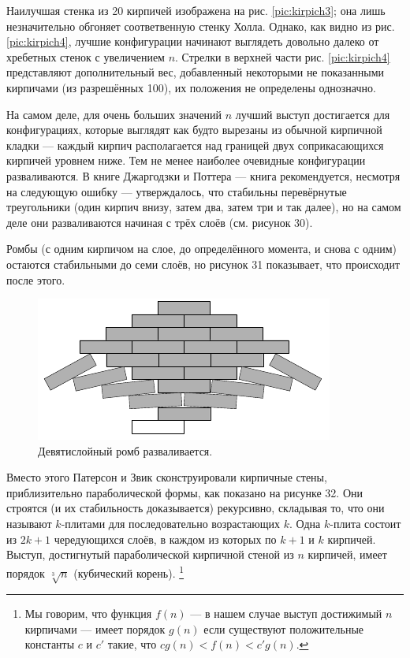 Наилучшая стенка из 20 кирпичей изображена на рис. \ref{pic:kirpich3};
она лишь незначительно обгоняет соответвенную стенку Холла.
Однако, как видно из рис. \ref{pic:kirpich4}, лучшие конфигурации начинают выглядеть довольно далеко от хребетных стенок с увеличением $n$.
Стрелки в верхней части рис. \ref{pic:kirpich4} представляют дополнительный вес, добавленный некоторыми не показанными кирпичами (из разрешённых 100), их положения не определены однозначно.

На самом деле, для очень больших значений $n$ лучший выступ достигается для конфигурациях, которые выглядят как будто вырезаны из обычной кирпичной кладки --- каждый кирпич располагается над границей двух соприкасающихся кирпичей уровнем ниже.
Тем не менее наиболее очевидные конфигурации разваливаются.
В книге Джаргодзки и Поттера \cite{38} --- книга рекомендуется, несмотря на следующую ошибку --- утверждалось, что стабильны перевёрнутые треугольники (один кирпич внизу, затем два, затем три и так далее), но на самом деле они разваливаются начиная с трёх слоёв (см. рисунок 30).  

Ромбы (с одним кирпичом на слое, до определённого момента, и снова с одним) остаются стабильными до семи слоёв, но рисунок 31 показывает, что происходит после этого.

\begin{figure}[htb!]
\centering
\includegraphics[scale=1]{pics/kirpich6}
\caption{Девятислойный ромб разваливается.}
\label{pic:kirpich6}
\end{figure}

Вместо этого Патерсон и Звик сконструировали кирпичные стены, приблизительно параболической формы, как показано на рисунке 32.
Они строятся (и их стабильность доказывается) рекурсивно, складывая то, что они называют $k$-плитами для последовательно возрастающих $k$.
Одна $k$-плита состоит из $2k + 1$ чередующихся слоёв, в каждом из которых по $k + 1$ и $k$ кирпичей.
Выступ, достигнутый параболической кирпичной стеной из $n$ кирпичей, имеет порядок $\sqrt[3]{n}$ (кубический корень).%
\footnote{Мы говорим, что функция $f (n)$ --- в нашем случае выступ достижимый $n$ кирпичами --- имеет порядок $g(n)$ если существуют положительные константы $c$ и $c'$ такие, что $cg(n) < f (n) < c' g(n)$.}

